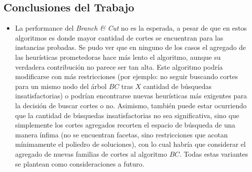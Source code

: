 \subsection{Conclusiones del Trabajo}

\begin{itemize}

\item La performance del \emph{Branch \& Cut} no es la esperada, a pesar de que en estos algoritmos es donde mayor cantidad de cortes se encuentran para las instancias probadas. Se pudo ver que en ninguno de los casos el agregado de las heurísticas prometedoras hace más lento el algoritmo, aunque su verdadera contribución no parece ser tan alta. Este algoritmo podría modificarse con más restricciones (por ejemplo: no seguir buscando cortes para un mismo nodo del árbol $BC$ tras $X$ cantidad de búsquedas insatisfactorias) o podrían encontrarse nuevas heurísticas más exigentes para la decisión de buscar cortes o no. Asimismo, también puede estar ocurriendo que la cantidad de búsquedas insatisfactorias no sea significativa, sino que simplemente los cortes agregados recorten el espacio de búsqueda de una manera ínfima (no se encuentran facetas, sino restricciones que acotan mínimamente el poliedro de soluciones), con lo cual habría que considerar el agregado de nuevas familias de cortes al algoritmo $BC$. Todas estas variantes se plantean como consideraciones a futuro.

\end{itemize}
